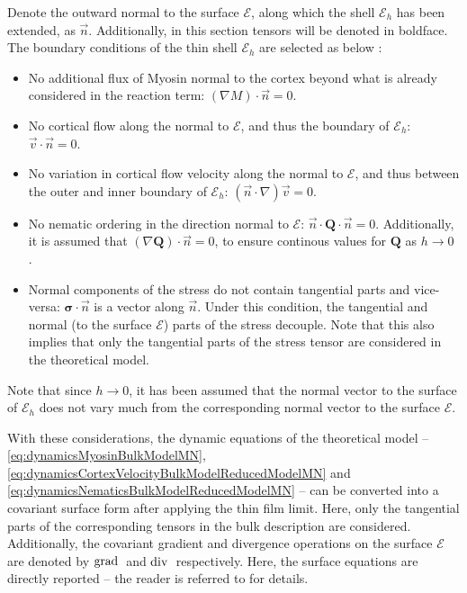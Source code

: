 Denote the outward normal to the surface $\mathcal{E}$, along which the shell $\mathcal{E}_h$ has been extended, as $\vec{n}$. Additionally, in this section tensors will be denoted in boldface. The boundary conditions of the thin shell $\mathcal{E}_h$ are selected as below \citep{nestler2020properties,arroyo2009relaxation,nitschke2020liquid}:
\begin{itemize}
    \item No additional flux of Myosin normal to the cortex beyond what is already considered in the reaction term: $(\nabla M)\cdot\vec{n} = 0$.
    \item No cortical flow along the normal to $\mathcal{E}$, and thus the boundary of $\mathcal{E}_h$: $\vec{v}\cdot\vec{n} = 0$.
    \item No variation in cortical flow velocity along the normal to $\mathcal{E}$, and thus between the outer and inner boundary of $\mathcal{E}_h$: $(\vec{n}\cdot\nabla)\vec{v} = 0$.
    \item No nematic ordering in the direction normal to $\mathcal{E}$: $\vec{n}\cdot\mathbf{Q}\cdot\vec{n} = 0$. Additionally, it is assumed that $(\nabla\mathbf{Q})\cdot\vec{n} = 0$, to ensure continous values for $\mathbf{Q}$ as $h \rightarrow 0$ \citep{nestler2020properties}.
    \item Normal components of the stress do not contain tangential parts and vice-versa: $\mathbf{\sigma}\cdot\vec{n}$ is a vector along $\vec{n}$. Under this condition, the tangential and normal (to the surface $\mathcal{E}$) parts of the stress decouple. Note that this also implies that only the tangential parts of the stress tensor are considered in the theoretical model.
\end{itemize}
Note that since $h \rightarrow 0$, it has been assumed that the normal vector to the surface of $\mathcal{E}_h$ does not vary much from the corresponding normal vector to the surface $\mathcal{E}$.

With these considerations, the dynamic equations of the theoretical model -- \autoref{eq:dynamicsMyosinBulkModelMN}, \autoref{eq:dynamicsCortexVelocityBulkModelReducedModelMN} and \autoref{eq:dynamicsNematicsBulkModelReducedModelMN} -- can be converted into a covariant surface form after applying the thin film limit. Here, only the tangential parts of the corresponding tensors in the bulk description are considered. Additionally, the covariant gradient and divergence operations on the surface $\mathcal{E}$ are denoted by $\mathrm{grad}\:$ and $\mathrm{div}\:$ respectively. Here, the surface equations are directly reported -- the reader is referred to \citep{axisConvergence} for details.

